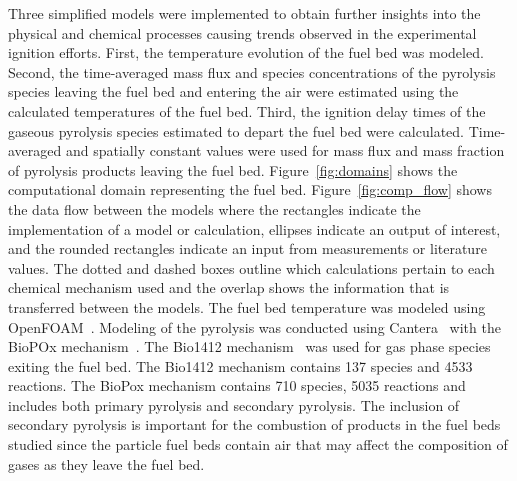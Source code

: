     Three simplified models were implemented to obtain further insights into the physical and chemical processes causing trends observed in the experimental ignition efforts.
    First, the temperature evolution of the fuel bed was modeled. Second, the time-averaged mass flux and species concentrations of the pyrolysis species leaving the fuel bed and entering the air were estimated using the calculated temperatures of the fuel bed. Third, the ignition delay times of the gaseous pyrolysis species estimated to depart the fuel bed were calculated. Time-averaged and spatially constant values were used for mass flux and mass fraction of pyrolysis products leaving the fuel bed. Figure~\ref{fig:domains} shows the computational domain representing the fuel bed. Figure~\ref{fig:comp_flow} shows the data flow between the models where the rectangles indicate the implementation of a model or calculation, ellipses indicate an output of interest, and the rounded rectangles indicate an input from measurements or literature values. The dotted and dashed boxes outline which calculations pertain to each chemical mechanism used and the overlap shows the information that is transferred between the models. The fuel bed temperature was modeled using OpenFOAM~\cite{Foundation2020}. Modeling of the pyrolysis was conducted using Cantera~\cite{Goodwin2020} with the BioPOx mechanism~\cite{Dhahak2019}. The Bio1412 mechanism~\cite{Ranzi2008, Ranzi2001} was used for gas phase species exiting the fuel bed. The Bio1412 mechanism contains 137 species and 4533 reactions. The BioPox mechanism contains 710 species, 5035 reactions and includes both primary pyrolysis and secondary pyrolysis. The inclusion of secondary pyrolysis is important for the combustion of products in the fuel beds studied since the particle fuel beds contain air that may affect the composition of gases as they leave the fuel bed. 


